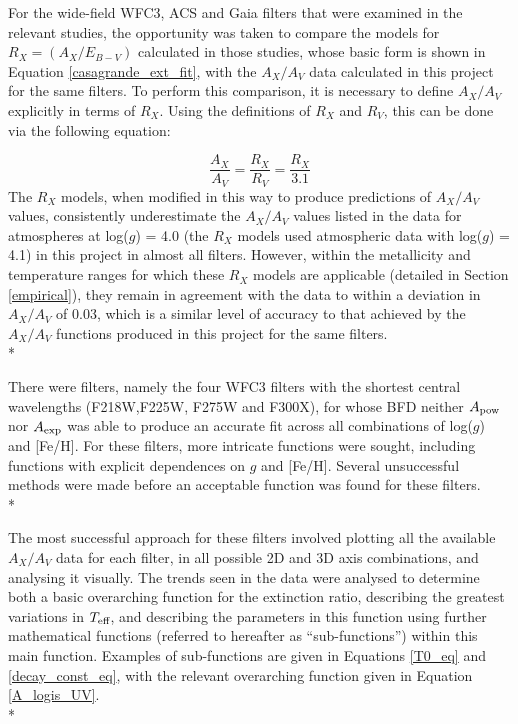 \documentclass[12pt, a4paper]{report}
\begin{document}
For the wide-field WFC3, ACS \citep{2014MNRAS.444..392C} and Gaia \citep{2018MNRAS.479L.102C} filters that were examined in the relevant studies, the opportunity was taken to compare the models for $R_{X} = (A_{X}/E_{B-V})$ calculated in those studies, whose basic form is shown in Equation \ref{casagrande_ext_fit}, with the $A_{X}/A_{V}$ data calculated in this project for the same filters. To perform this comparison, it is necessary to define $A_{X}/A_{V}$ explicitly in terms of $R_{X}$. Using the definitions of $R_{X}$ and $R_{V}$, this can be done via the following equation:

\begin{equation}
\frac{A_{X}}{A_{V}} = \frac{R_{X}}{R_{V}} = \frac{R_{X}}{3.1}
\label{convert_Rx_to_Ax}
\end{equation}
The $R_{X}$ models, when modified in this way to produce predictions of $A_{X}/A_{V}$ values, consistently underestimate the $A_{X}/A_{V}$ values listed in the data for atmospheres at log($g$) = 4.0 (the $R_{X}$ models used atmospheric data with log($g$) = 4.1) in this project in almost all filters. However, within the metallicity and temperature ranges for which these $R_{X}$ models are applicable (detailed in Section \ref{empirical}), they remain in agreement with the data to within a deviation in $A_{X}/A_{V}$ of 0.03, which is a similar level of accuracy to that achieved by the $A_{X}/A_{V}$ functions produced in this project for the same filters.\\*

There were filters, namely the four WFC3 filters with the shortest central wavelengths (F218W,F225W, F275W and F300X), for whose BFD neither $A_{\textnormal{pow}}$ nor $A_{\textnormal{exp}}$ was able to produce an accurate fit across all combinations of log($g$) and [Fe/H]. For these filters, more intricate functions were sought, including functions with explicit dependences on $g$ and [Fe/H]. Several unsuccessful methods were made before an acceptable function was found for these filters.\\*

The most successful approach for these filters involved plotting all the available $A_{X}/A_{V}$ data for each filter, in all possible 2D and 3D axis combinations, and analysing it visually. The trends seen in the data were analysed to determine both a basic overarching function for the extinction ratio, describing the greatest variations in $T_{\textnormal{eff}}$, and describing the parameters in this function using further mathematical functions (referred to hereafter as ``sub-functions'') within this main function. Examples of sub-functions are given in Equations \ref{T0_eq} and \ref{decay_const_eq}, with the relevant overarching function given in Equation \ref{A_logis_UV}.\\*
\end{document}
